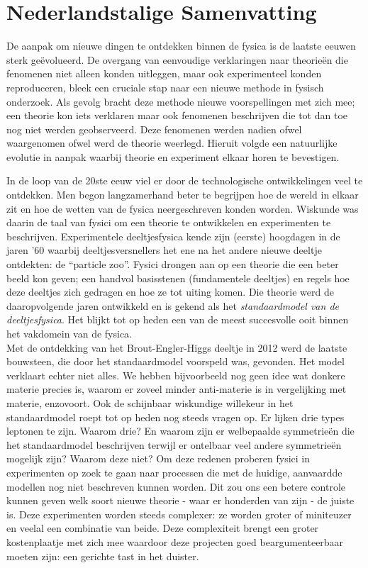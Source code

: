 \chapter*{Nederlandstalige Samenvatting}\label{nederlands}
%

De aanpak om nieuwe dingen te ontdekken binnen de fysica is de laatste eeuwen sterk ge\"evolueerd. De overgang van eenvoudige verklaringen naar theorie\"en die fenomenen niet alleen konden uitleggen, maar ook experimenteel konden reproduceren, bleek een cruciale stap naar een nieuwe methode in fysisch onderzoek. Als gevolg bracht deze methode nieuwe voorspellingen met zich mee; een theorie kon iets verklaren maar ook fenomenen beschrijven die tot dan toe nog niet werden geobserveerd. Deze fenomenen werden nadien ofwel waargenomen ofwel werd de theorie weerlegd. Hieruit volgde een natuurlijke evolutie in aanpak waarbij theorie en experiment elkaar horen te bevestigen.

In de loop van de 20ste eeuw viel er door de technologische ontwikkelingen veel te ontdekken. Men begon langzamerhand beter te begrijpen hoe de wereld in elkaar zit en hoe de wetten van de fysica neergeschreven konden worden. Wiskunde was daarin de taal van fysici om een theorie te ontwikkelen en experimenten te beschrijven. Experimentele deeltjesfysica kende zijn (eerste) hoogdagen in de jaren '60 waarbij deeltjesversnellers het ene na het andere nieuwe deeltje ontdekten: de ``particle zoo''. Fysici drongen aan op een theorie die een beter beeld kon geven; een handvol basisstenen (fundamentele deeltjes) en regels hoe deze deeltjes zich gedragen en hoe ze tot uiting komen. Die theorie werd de daaropvolgende jaren ontwikkeld en is gekend als het \textit{standaardmodel van de deeltjesfysica}. Het blijkt tot op heden een van de meest succesvolle ooit binnen het vakdomein van de fysica.\\

\noindent Met de ontdekking van het Brout-Engler-Higgs deeltje in 2012 werd de laatste bouwsteen, die door het standaardmodel voorspeld was, gevonden. Het model verklaart echter niet alles. We hebben bijvoorbeeld nog geen idee wat donkere materie precies is, waarom er zoveel minder anti-materie is in vergelijking met materie, enzovoort. Ook de schijnbaar wiskundige willekeur in het standaardmodel roept tot op heden nog steeds vragen op. Er lijken drie types leptonen te zijn. Waarom drie? En waarom zijn er welbepaalde symmetrie\"en die het standaardmodel beschrijven terwijl er ontelbaar veel andere symmetrie\"en mogelijk zijn? Waarom deze niet? Om deze redenen proberen fysici in experimenten op zoek te gaan naar processen die met de huidige, aanvaardde modellen nog niet beschreven kunnen worden. Dit zou ons een betere controle kunnen geven welk soort nieuwe theorie - waar er honderden van zijn - de juiste is. Deze experimenten worden steeds complexer: ze worden groter of miniteuzer en veelal een combinatie van beide. Deze complexiteit brengt een groter kostenplaatje met zich mee waardoor deze projecten goed beargumenteerbaar moeten zijn: een gerichte tast in het duister.


